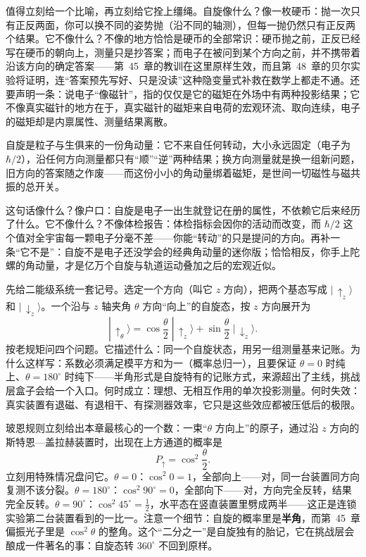 值得立刻给一个比喻，再立刻给它拴上缰绳。自旋像什么？像一枚硬币：抛一次只有正反两面，你可以换不同的姿势抛（沿不同的轴测），但每一抛仍然只有正反两个结果。它不像什么？不像的地方恰恰是硬币的全部常识：硬币抛之前，正反已经写在硬币的朝向上，测量只是抄答案；而电子在被问到某个方向之前，并不携带着沿该方向的确定答案——第~45~章的教训在这里原样生效，而且第~48~章的贝尔实验将证明，连“答案预先写好、只是没读”这种隐变量式补救在数学上都走不通。还要声明一条：说电子“像磁针”，指的仅仅是它的磁矩在外场中有两种投影结果；它不像真实磁针的地方在于，真实磁针的磁矩来自电荷的宏观环流、取向连续，电子的磁矩却是内禀属性、测量结果离散。


\begin{oneline}
自旋是粒子与生俱来的一份角动量：它不来自任何转动，大小永远固定（电子为 $\hbar/2$），沿任何方向测量都只有“顺”“逆”两种结果；换方向测量就是换一组新问题，旧方向的答案随之作废——而这份小小的角动量绑着磁矩，是世间一切磁性与磁共振的总开关。
\end{oneline}

这句话像什么？像户口：自旋是电子一出生就登记在册的属性，不依赖它后来经历了什么。它不像什么？不像体检报告：体检指标会因你的活动而改变，而 $\hbar/2$ 这个值对全宇宙每一颗电子分毫不差——你能“转动”的只是提问的方向。再补一条“它不是”：自旋不是电子还没学会的经典角动量的迷你版；恰恰相反，你手上陀螺的角动量，才是亿万个自旋与轨道运动叠加之后的宏观近似。


先给二能级系统一套记号。选定一个方向（叫它 $z$ 方向），把两个基态写成 $|\,{\uparrow}_z\rangle$ 和 $|\,{\downarrow}_z\rangle$。一个沿与 $z$ 轴夹角 $\theta$ 方向“向上”的自旋态，按 $z$ 方向展开为
\[
|\,{\uparrow}_\theta\rangle=\cos\frac{\theta}{2}\;|\,{\uparrow}_z\rangle+\sin\frac{\theta}{2}\;|\,{\downarrow}_z\rangle .
\]
按老规矩问四个问题。它描述什么：同一个自旋状态，用另一组测量基来记账。为什么这样写：系数必须满足模平方和为一（概率总归一），且要保证 $\theta=0$ 时纯上、$\theta=180^\circ$ 时纯下——半角形式是自旋特有的记账方式，来源超出了主线，挑战层盒子会给一个入口。何时成立：理想、无相互作用的单次投影测量。何时失效：真实装置有退磁、有退相干、有探测器效率，它只是这些效应都被压低后的极限。

玻恩规则立刻给出本章最核心的一个数：一束“$\theta$ 方向上”的原子，通过沿 $z$ 方向的斯特恩—盖拉赫装置时，出现在上方通道的概率是
\[
P_{\uparrow}=\cos^{2}\frac{\theta}{2}.
\]
立刻用特殊情况盘问它。$\theta=0$：$\cos^2 0=1$，全部向上——对，同一台装置同方向复测不该分裂。$\theta=180^\circ$：$\cos^2 90^\circ=0$，全部向下——对，方向完全反转，结果完全反转。$\theta=90^\circ$：$\cos^2 45^\circ=\tfrac12$，水平态在竖直装置里劈成两半——这正是连锁实验第二台装置看到的一比一。注意一个细节：自旋的概率里是\textbf{半角}，而第~45~章偏振光子里是 $\cos^2\theta$ 的整角。这个“二分之一”是自旋独有的胎记，它在挑战层会酿成一件著名的事：自旋态转 $360^\circ$ 不回到原样。

